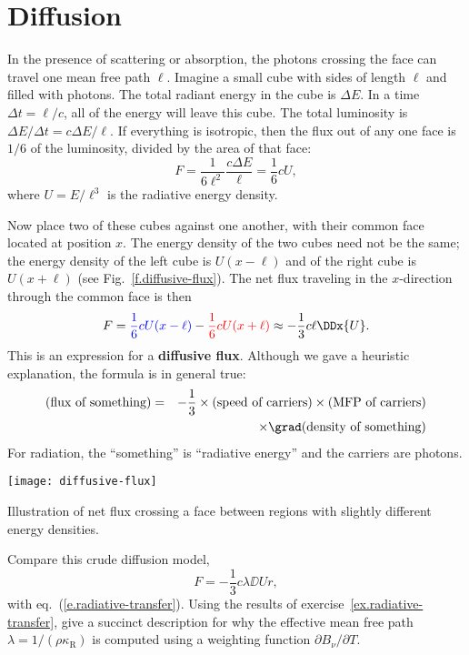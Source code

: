 \section{Diffusion}\label{s.diffusion}

In the presence of scattering or absorption, the photons crossing the face can travel one mean free path $\ell$. Imagine a small cube with sides of length $\ell$ and filled with photons. The total radiant energy in the cube is $\Delta E$. In a time $\Delta t = \ell/c$, all of the energy will leave this cube. The total luminosity is $\Delta E/\Delta t = c\Delta E/\ell$. If everything is isotropic, then the flux out of any one face is $1/6$ of the luminosity, divided by the area of that face:
\[
	F = \frac{1}{6\ell^{2}}\frac{c\Delta E}{\ell} = \frac{1}{6}c U,
\]
where $U = E/\ell^{3}$ is the radiative energy density. 

Now place two of these cubes against one another, with their common face located at position $x$. The energy density of the two cubes need not be the same; the energy density of the left cube is $U(x-\ell)$ and of the right cube is $U(x+\ell)$ (see Fig.~\ref{f.diffusive-flux}). The net flux traveling in the $x$-direction through the common face is then
\[
	F = {\color{blue}\frac{1}{6} c U(x-\ell)} - {\color{red}\frac{1}{6} c U(x+\ell)} \approx -\frac{1}{3}c\ell \DDx{U}.
\]
This is an expression for a \textbf{diffusive flux}. Although we gave a heuristic explanation, the formula is in general true:
\begin{eqnarray}
\nonumber
(\textrm{flux of something}) &=& -\frac{1}{3}\times(\textrm{speed of carriers})\times(\textrm{MFP of carriers})\\
&&\times \grad(\textrm{density of something})
\label{e.diffusive-flux}
\end{eqnarray}
For radiation, the ``something'' is ``radiative energy'' and the carriers are photons.
\begin{marginfigure}[-12\baselineskip]
\texttt{[image: diffusive-flux]}
\caption{\label{f.diffusive-flux} Illustration of net flux crossing a face between regions with slightly different energy densities.}
\end{marginfigure}

\begin{exercisebox}
Compare this crude diffusion model,
\[
	F = -\frac{1}{3}c\lambda\DD{U}{r},
\]
with eq.~(\ref{e.radiative-transfer}). Using the results of exercise~\ref{ex.radiative-transfer}, give a succinct description for why the effective mean free path $\lambda = 1/(\rho\kappa_{\mathrm{R}})$ is computed using a weighting function $\partial B_{\nu}/\partial T$.
\end{exercisebox}

